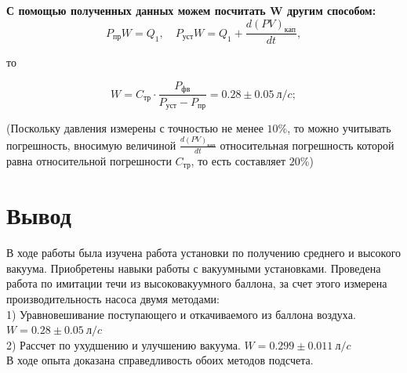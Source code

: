 \documentclass[a4paper, 12pt]{article}%
\begin{document}
\textbf{С помощью полученных данных можем посчитать W другим способом:}
$$
P_{пр} W = Q_1, \quad P_{уст} W = Q_1 + \frac{d(PV)_{кап}}{dt}, 
$$

то 

$$
W = C_{тр}\cdot \frac{P_{фв}}{P_{ уст}-P_{пр}} = 0.28 \pm 0.05 ~л / c;
$$


(Поскольку давления измерены с точностью не менее $10\%$, то можно учитывать погрешность, вносимую величиной $\frac{d(PV)_{кап}}{dt}$ относительная погрешность которой равна относительной погрешности $C_{тр}$, то есть составляет $20\%$)
\section{Вывод}
В ходе работы была изучена работа установки по получению среднего и высокого вакуума. Приобретены навыки работы с вакуумными установками. Проведена работа по имитации течи из высоковакуумного баллона, за счет этого измерена производительность насоса двумя методами:\\
1) Уравновешивание поступающего и откачиваемого из баллона воздуха. $W = 0.28 \pm 0.05 ~л / c $\\
2) Рассчет по ухудшению и улучшению вакуума. $W = 0.299 \pm 0.011 ~л / c $\\
В ходе опыта доказана справедливость обоих методов подсчета.
\end{document}
